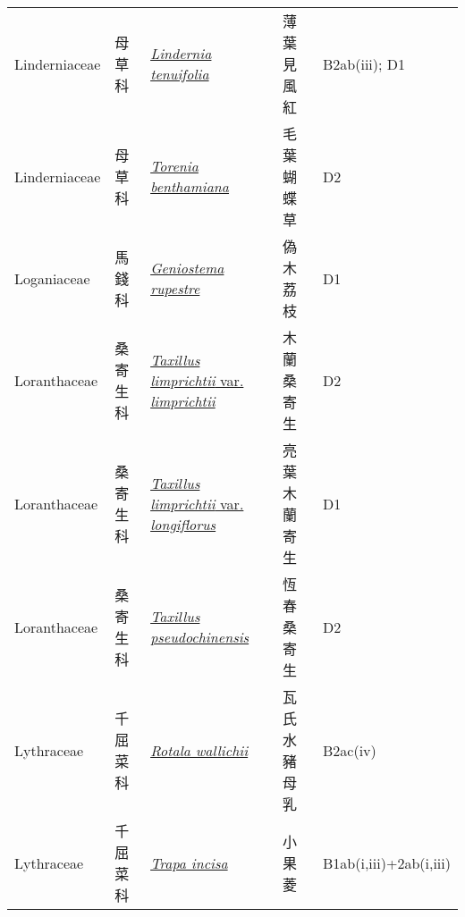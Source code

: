 {\begin{longtable}{L{2.5cm}L{2cm}L{5cm}L{2.5cm}L{3cm}}
    Linderniaceae & 母草科 & \href{http://www.theplantlist.org/tpl1.1/search?q=Lindernia+tenuifolia}{\textit{Lindernia tenuifolia} } & 薄葉見風紅 & B2ab(iii); D1    \\
    Linderniaceae & 母草科 & \href{http://www.theplantlist.org/tpl1.1/search?q=Torenia+benthamiana}{\textit{Torenia benthamiana} } & 毛葉蝴蝶草 & D2    \\
    Loganiaceae & 馬錢科 & \href{http://www.theplantlist.org/tpl1.1/search?q=Geniostema+rupestre}{\textit{Geniostema rupestre} } & 偽木荔枝 & D1    \\
    Loranthaceae & 桑寄生科 & \href{http://www.theplantlist.org/tpl1.1/search?q=Taxillus+limprichtii+var.+limprichtii}{\textit{Taxillus limprichtii} var. \textit{limprichtii} } & 木蘭桑寄生 & D2    \\
    Loranthaceae & 桑寄生科 & \href{http://www.theplantlist.org/tpl1.1/search?q=Taxillus+limprichtii+var.+longiflorus}{\textit{Taxillus limprichtii} var. \textit{longiflorus} } & 亮葉木蘭寄生 & D1    \\
    Loranthaceae & 桑寄生科 & \href{http://www.theplantlist.org/tpl1.1/search?q=Taxillus+pseudochinensis}{\textit{Taxillus pseudochinensis} } & 恆春桑寄生 & D2    \\
    Lythraceae & 千屈菜科 & \href{http://www.theplantlist.org/tpl1.1/search?q=Rotala+wallichii}{\textit{Rotala wallichii} } & 瓦氏水豬母乳 & B2ac(iv)    \\
    Lythraceae & 千屈菜科 & \href{http://www.theplantlist.org/tpl1.1/search?q=Trapa+incisa}{\textit{Trapa incisa} } & 小果菱 & B1ab(i,iii)+2ab(i,iii)    \\

\end{longtable}}
